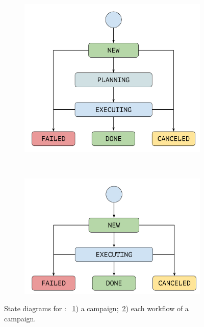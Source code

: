 \begin{figure}[t]
    \centering
    \begin{subfigure}[b]{0.45\textwidth}
        \includegraphics[width=.95\textwidth]{figures/manager/campaign-state-model.pdf}
        \caption{}
        \label{fig:CampaignStates}
    \end{subfigure}
    ~
    \begin{subfigure}[b]{0.45\textwidth}
        \includegraphics[width=.95\textwidth]{figures/manager/workflow-state-model.pdf}
        \caption{}
        \label{fig:WorkflowStates}
    \end{subfigure}
    \caption{State diagrams for : ~\ref{fig:CampaignStates}) a campaign;~\ref{fig:WorkflowStates}) each workflow of a campaign.}
    \label{fig:StateDiagrams}
\end{figure}

